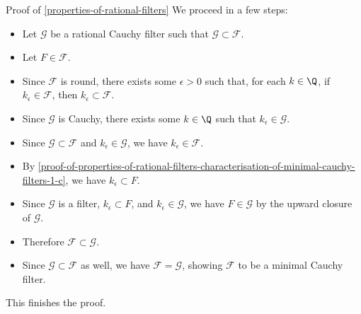 \begin{Proof}{Proof of \cref{properties-of-rational-filters}}
    We proceed in a few steps:
    \begin{itemize}
        \item Let $\mathcal{G}$ be a rational Cauchy filter such that $\mathcal{G}\subset\mathcal{F}$.
        \item Let $F\in\mathcal{F}$.
        \item Since $\mathcal{F}$ is round, there exists some $\epsilon\gt0$ such that, for each $k\in\Q$, if $k_{\epsilon}\in\mathcal{F}$, then $k_{\epsilon}\subset\mathcal{F}$.
        \item Since $\mathcal{G}$ is Cauchy, there exists some $k\in\Q$ such that $k_{\epsilon}\in\mathcal{G}$.
        \item Since $\mathcal{G}\subset\mathcal{F}$ and $k_{\epsilon}\in\mathcal{G}$, we have $k_{\epsilon}\in\mathcal{F}$.
        \item By \cref{proof-of-properties-of-rational-filters-characterisation-of-minimal-cauchy-filters-1-c}, we have $k_{\epsilon}\subset F$.
        \item Since $\mathcal{G}$ is a filter, $k_{\epsilon}\subset F$, and $k_{\epsilon}\in\mathcal{G}$, we have $F\in\mathcal{G}$ by the upward closure of $\mathcal{G}$.
        \item Therefore $\mathcal{F}\subset\mathcal{G}$.
        \item Since $\mathcal{G}\subset\mathcal{F}$ as well, we have $\mathcal{F}=\mathcal{G}$, showing $\mathcal{F}$ to be a minimal Cauchy filter.
    \end{itemize}
    This finishes the proof.


\end{Proof}
